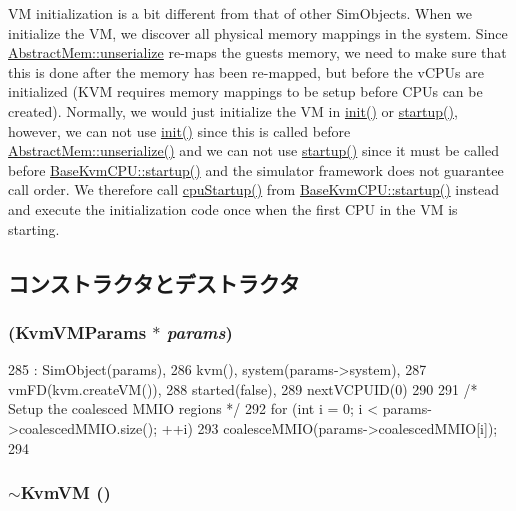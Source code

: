 VM initialization is a bit different from that of other SimObjects. When we initialize the VM, we discover all physical memory mappings in the system. Since \hyperlink{thread__context_8hh_aab2bbbf3710db70a2886ed6c49038af7}{AbstractMem::unserialize} re-\/maps the guests memory, we need to make sure that this is done after the memory has been re-\/mapped, but before the vCPUs are initialized (KVM requires memory mappings to be setup before CPUs can be created). Normally, we would just initialize the VM in \hyperlink{classSimObject_a02fd73d861ef2e4aabb38c0c9ff82947}{init()} or \hyperlink{classSimObject_aecc7d8debf54990ffeaaed5bac7d7d81}{startup()}, however, we can not use \hyperlink{classSimObject_a02fd73d861ef2e4aabb38c0c9ff82947}{init()} since this is called before \hyperlink{thread__context_8cc_aab2bbbf3710db70a2886ed6c49038af7}{AbstractMem::unserialize()} and we can not use \hyperlink{classSimObject_aecc7d8debf54990ffeaaed5bac7d7d81}{startup()} since it must be called before \hyperlink{classBaseKvmCPU_aecc7d8debf54990ffeaaed5bac7d7d81}{BaseKvmCPU::startup()} and the simulator framework does not guarantee call order. We therefore call \hyperlink{classKvmVM_a0161816a71e88927cba137fb4dde7298}{cpuStartup()} from \hyperlink{classBaseKvmCPU_aecc7d8debf54990ffeaaed5bac7d7d81}{BaseKvmCPU::startup()} instead and execute the initialization code once when the first CPU in the VM is starting. 

\subsection{コンストラクタとデストラクタ}
\hypertarget{classKvmVM_affe776b6ed46258acb05e93d1e3ea060}{
\subsubsection[{KvmVM}]{ (KvmVMParams $\ast$ {\em params})}}
\label{classKvmVM_affe776b6ed46258acb05e93d1e3ea060}



\begin{DoxyCode}
285     : SimObject(params),
286       kvm(), system(params->system),
287       vmFD(kvm.createVM()),
288       started(false),
289       nextVCPUID(0)
290 {
291     /* Setup the coalesced MMIO regions */
292     for (int i = 0; i < params->coalescedMMIO.size(); ++i)
293         coalesceMMIO(params->coalescedMMIO[i]);
294 }
\end{DoxyCode}
\hypertarget{classKvmVM_a57e34345c5d7c563ce7bdddcd0fb6017}{
\subsubsection[{$\sim$KvmVM}]{\setlength{\rightskip}{0pt plus 5cm}$\sim${\bf KvmVM} ()}}
\label{classKvmVM_a57e34345c5d7c563ce7bdddcd0fb6017}



